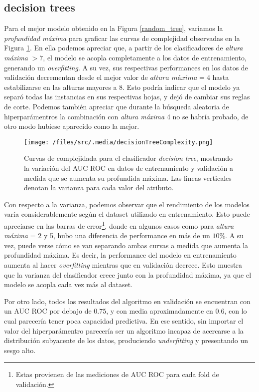\subsection{decision trees}
Para el mejor modelo obtenido en la Figura \ref{random_tree}, variamos la \textit{profundidad máxima} para graficar las curvas de complejidad observadas en la Figura \ref{decisionTreeComplexity}. En ella podemos apreciar que, a partir de los clasificadores de \textit{altura máxima} $> 7$, el modelo se acopla completamente a los datos de entrenamiento, generando un \textit{overfitting}. A su vez, sus respectivas performances en los datos de validación decrementan desde el mejor valor de $\textit{altura máxima} = 4$ hasta estabilizarse en las alturas mayores a 8. Esto podría indicar que el modelo ya separó todas las instancias en sus respectivas hojas, y dejó de cambiar sus reglas de corte. Podemos también apreciar que durante la búsqueda aleatoria de hiperparámentros la combinación con \textit{altura máxima} 4 no se habría probado, de otro modo hubiese aparecido como la mejor.  
\begin{figure}[!htbp]
    \centering
    \texttt{[image: /files/src/.media/decisionTreeComplexity.png]}
    \caption{Curvas de complejidada para el clasificador \textit{decision tree}, mostrando la variación del AUC ROC en datos de entrenamiento y validación a medida que se aumenta su profundida máxima. Las lineas verticales denotan la varianza para cada valor del atributo.}
    \label{decisionTreeComplexity}
\end{figure}

Con respecto a la varianza, podemos observar que el rendimiento de los modelos varía considerablemente según el dataset utilizado en entrenamiento. Esto puede apreciarse en las barras de error\footnote{Estas provienen de las mediciones de AUC ROC para cada fold de validación.}, donde en algunos casos como para \textit{altura máxima} = 2 y 5, hubo una diferencia de performance en más de un $10\%$. A su vez, puede verse cómo se van separando ambas curvas a medida que aumenta la profundidad máxima. Es decir, la performance del modelo en entrenamiento aumenta al hacer \textit{overfitting} mientras que en validación decrece. Esto muestra que la varianza del clasificador crece junto con la profundidad máxima, ya que el modelo se acopla cada vez más al dataset.

Por otro lado, todos los resultados del algoritmo en validación se encuentran con un AUC ROC por debajo de $0.75$, y con media aproximadamente en $0.6$, con lo cual parecería tener poca capacidad predictiva. En ese sentido, sin importar el valor del hiperparámentro parecería ser un algoritmo incapaz de acercarse a la distribución subyacente de los datos, produciendo \textit{underfitting} y presentando un sesgo alto.

